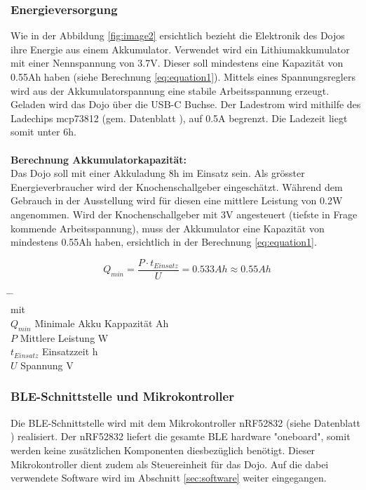 \documentclass[10pt,a4paper,oneside]{99_fhnwreport}
\begin{document}
\subsubsection{Energieversorgung}
Wie in der Abbildung \ref{fig:image2} ersichtlich bezieht die Elektronik des Dojos ihre Energie aus einem Akkumulator. Verwendet wird ein Lithiumakkumulator mit einer Nennspannung von 3.7V. Dieser soll mindestens eine Kapazität von 0.55Ah haben (siehe Berechnung \ref{eq:equation1}). Mittels eines Spannungsreglers wird aus der Akkumulatorspannung eine stabile Arbeitsspannung erzeugt. Geladen wird das Dojo über die USB-C Buchse. Der Ladestrom wird mithilfe des Ladechips mcp73812 (gem. Datenblatt \cite{MCP73811}), auf 0.5A begrenzt. Die Ladezeit liegt somit unter 6h.\\
\\
\textbf{Berechnung Akkumulatorkapazität:}\\
Das Dojo soll mit einer Akkuladung 8h im Einsatz sein. Als grösster Energieverbraucher wird der Knochenschallgeber eingeschätzt. Während dem Gebrauch in der Ausstellung wird für diesen eine mittlere Leistung von 0.2W angenommen. Wird der Knochenschallgeber mit 3V angesteuert (tiefste in Frage kommende Arbeitsspannung), muss der Akkumulator eine Kapazität von mindestens 0.55Ah haben, ersichtlich in der Berechnung \ref{eq:equation1}.

\begin{equation}
Q_{min} = \frac{P \cdot t_{Einsatz}}{U} = 0.533Ah \approx 0.55Ah
\label{eq:equation1}
\end{equation}
\begin{tabbing}
\hspace{20mm}	\=  \hspace{60mm} \= \hspace{30mm}	\= 	\\
mit	\\
$Q_{min}$	\> Minimale Akku Kappazität	 Ah	\>	\\
$P$		\> Mittlere Leistung		 W \>	\\
$t_{Einsatz}$	\> Einsatzzeit			 h	\\
$U$		\> Spannung			 V	\\
\end{tabbing}

\subsubsection{BLE-Schnittstelle und Mikrokontroller}
Die BLE-Schnittstelle wird mit dem Mikrokontroller nRF52832 (siehe Datenblatt \cite{NRF52832}) realisiert. Der nRF52832 liefert die gesamte BLE hardware "oneboard", somit werden keine zusätzlichen Komponenten diesbezüglich benötigt. Dieser Mikrokontroller dient zudem als Steuereinheit für das Dojo. Auf die dabei verwendete Software wird im Abschnitt \ref{sec:software} weiter eingegangen.
\end{document}
